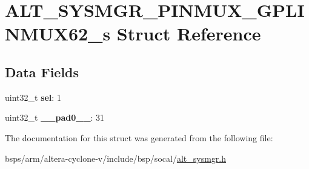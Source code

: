 \hypertarget{structALT__SYSMGR__PINMUX__GPLINMUX62__s}{}\section{A\+L\+T\+\_\+\+S\+Y\+S\+M\+G\+R\+\_\+\+P\+I\+N\+M\+U\+X\+\_\+\+G\+P\+L\+I\+N\+M\+U\+X62\+\_\+s Struct Reference}
\label{structALT__SYSMGR__PINMUX__GPLINMUX62__s}
\subsection*{Data Fields}
\begin{DoxyCompactItemize}
\item 
\mbox{\label{structALT__SYSMGR__PINMUX__GPLINMUX62__s_a42ccb58d29b4c1aed0bea79ca8fa4cf1}} 
uint32\+\_\+t {\bfseries sel}\+: 1
\item 
\mbox{\label{structALT__SYSMGR__PINMUX__GPLINMUX62__s_a4b0cec732fc36084f5065bd42e34f6fc}} 
uint32\+\_\+t {\bfseries \+\_\+\+\_\+pad0\+\_\+\+\_\+}\+: 31
\end{DoxyCompactItemize}


The documentation for this struct was generated from the following file\+:\begin{DoxyCompactItemize}
\item 
bsps/arm/altera-\/cyclone-\/v/include/bsp/socal/\mbox{\hyperlink{alt__sysmgr_8h}{alt\+\_\+sysmgr.\+h}}\end{DoxyCompactItemize}
